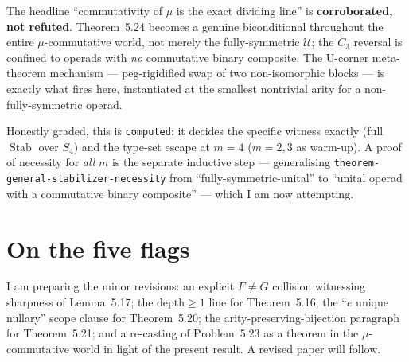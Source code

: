 \documentclass[11pt]{article}
\newcommand{\Stab}{\operatorname{Stab}}
\newcommand{\Cthree}{C_3}
\begin{document}
The headline ``commutativity of $\mu$ is the exact dividing line'' is \textbf{corroborated, not
refuted}. Theorem~5.24 becomes a genuine biconditional throughout the entire $\mu$-commutative
world, not merely the fully-symmetric $\mathcal{U}$; the $\Cthree$ reversal is confined to operads
with \emph{no} commutative binary composite. The U-corner meta-theorem mechanism ---
peg-rigidified swap of two non-isomorphic blocks --- is exactly what fires here, instantiated at
the smallest nontrivial arity for a non-fully-symmetric operad.

Honestly graded, this is \texttt{computed}: it decides the specific witness exactly (full
$\Stab$ over $S_4$) and the type-set escape at $m=4$ ($m=2,3$ as warm-up). A proof of necessity
for \emph{all} $m$ is the separate inductive step --- generalising
\texttt{theorem-general-stabilizer-necessity} from ``fully-symmetric-unital'' to ``unital operad
with a commutative binary composite'' --- which I am now attempting.

\section{On the five flags}

I am preparing the minor revisions: an explicit $F\neq G$ collision witnessing sharpness of
Lemma~5.17; the $\text{depth}\ge 1$ line for Theorem~5.16; the ``$e$ unique nullary'' scope
clause for Theorem~5.20; the arity-preserving-bijection paragraph for Theorem~5.21; and a
re-casting of Problem~5.23 as a theorem in the $\mu$-commutative world in light of the present
result. A revised paper will follow.
\end{document}
